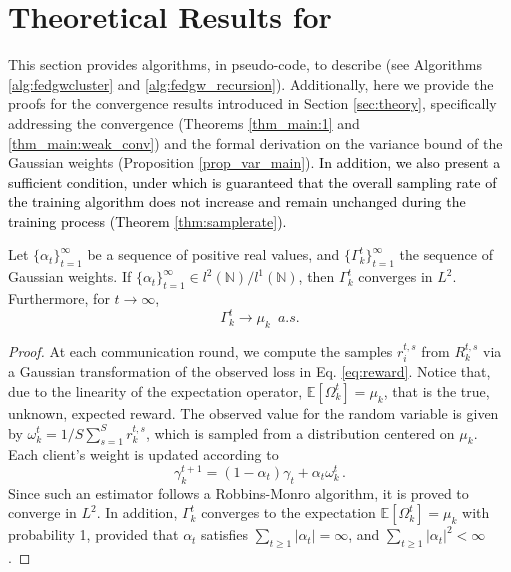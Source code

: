 \section{Theoretical Results for \shortname}\label{app:fgw}

This section provides algorithms, in pseudo-code, to describe \shortname (see Algorithms \ref{alg:fedgwcluster} and \ref{alg:fedgw_recursion}). Additionally, here we provide the proofs for the convergence results introduced in Section \ref{sec:theory}, specifically addressing the convergence (Theorems \ref{thm_main:1} and \ref{thm_main:weak_conv}) and the formal derivation on the variance bound of the Gaussian weights (Proposition \ref{prop_var_main}). \textcolor{black}{In addition, we also present a sufficient condition, under which is guaranteed that the overall sampling rate of the training algorithm does not increase and remain unchanged during the training process (Theorem \ref{thm:samplerate}).}

\begin{theorem}\label{thm:1}
Let $\{\alpha_t\}_{t = 1}^\infty$ be a sequence of positive real values, and $\{\Gamma_k^t\}_{t=1}^\infty$ the sequence of Gaussian weights. If $\{\alpha_t\}_{t = 1}^\infty \in l^2(\mathbb{N})/l^1(\mathbb{N})$, then $\Gamma_k^t$ converges in $L^2$. Furthermore, for $t\to\infty$, 
\begin{equation}
    \Gamma_k^t \longrightarrow \mu_k\,\,\, a.s.
\end{equation}
\end{theorem}
\begin{proof}
At each communication round, we compute the samples $r_i^{t,s}$ from $R_k^{t,s}$ via a Gaussian transformation of the observed loss in Eq. \ref{eq:reward}. Notice that, due to the linearity of the expectation operator, $\mathbb{E}[\Omega_k^t] = \mu_k$, that is the true, unknown, expected reward. The observed value for the random variable is given by $\omega_k^t = 1/S \sum_{s = 1}^S r_k^{t,s}$, which is sampled from a distribution centered on $\mu_k$.
Each client's weight is updated according to
\begin{equation}\label{weight_formula}
    \gamma_k^{t+1} = (1-\alpha_t)\gamma_t + \alpha_t \omega_k^t\,.
\end{equation}
Since such an estimator follows a Robbins-Monro algorithm, it is proved to converge in $L^2$. In addition, $\Gamma_k^t$ converges to the expectation $\mathbb{E}[\Omega_k^t] = \mu_k$ with probability 1, provided that $\alpha_t$ satisfies $\sum_{t\geq 1}|\alpha_t| = \infty$, and $\sum_{t\geq 1}|\alpha_t|^2 < \infty$ \citep{harold1997stochastic}.
\end{proof}

